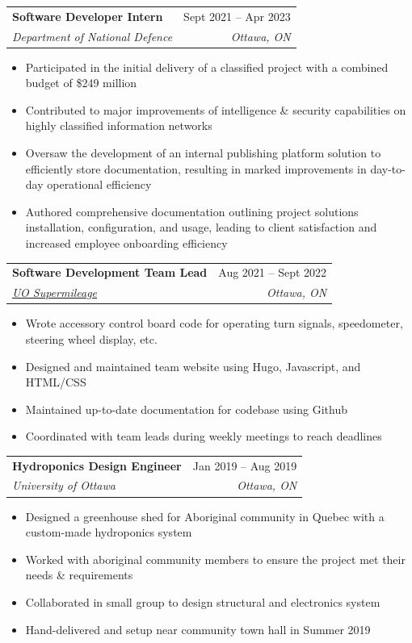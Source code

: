 \documentclass[letterpaper,11pt]{article}
\makeatletter
\newcommand{\resumeItem}[1]{
  \item\small{
    {#1 \vspace{-2pt}}
  }
}
\newcommand{\resumeSubheading}[4]{
  \vspace{-2pt}\item
    \begin{tabular*}{0.97\textwidth}[t]{l@{\extracolsep{\fill}}r}
      \textbf{#1} & #2 \\
      \textit{\small#3} & \textit{\small #4} \\
    \end{tabular*}\vspace{-7pt}
}
\newcommand{\resumeItemListStart}{\begin{itemize}}
\newcommand{\resumeItemListEnd}{\end{itemize}\vspace{-5pt}}
\makeatother
\begin{document}
\resumeSubheading
{Software Developer Intern}{Sept 2021 -- Apr 2023}
{Department of National Defence}{Ottawa, ON}
\resumeItemListStart
\resumeItem {Participated in the initial delivery of a classified project with a combined budget of \$249 million}
\resumeItem {Contributed to major improvements of intelligence \& security capabilities on highly classified information networks}
\resumeItem {Oversaw the development of an internal publishing platform solution to efficiently store documentation, resulting in marked improvements in day-to-day operational efficiency}
\resumeItem {Authored comprehensive documentation outlining project solutions installation, configuration, and usage, leading to client satisfaction and increased employee onboarding efficiency}
\resumeItemListEnd

\resumeSubheading
{Software Development Team Lead}{Aug 2021 -- Sept 2022}
{\href{https://uosupermileage.ca}{UO Supermileage}}{Ottawa, ON}
\resumeItemListStart
\resumeItem {Wrote accessory control board code for operating turn signals, speedometer, steering wheel display, etc.}
\resumeItem {Designed and maintained team website using Hugo, Javascript, and HTML/CSS}
\resumeItem {Maintained up-to-date documentation for codebase using Github}
\resumeItem {Coordinated with team leads during weekly meetings to reach deadlines}
\resumeItemListEnd

\resumeSubheading
{Hydroponics Design Engineer}{Jan 2019 -- Aug 2019}
{University of Ottawa}{Ottawa, ON}
\resumeItemListStart
\resumeItem {Designed a greenhouse shed for Aboriginal community in Quebec with a custom-made hydroponics system}
\resumeItem {Worked with aboriginal community members to ensure the project met their needs \& requirements}
\resumeItem {Collaborated in small group to design structural and electronics system}
\resumeItem {Hand-delivered and setup near community town hall in Summer 2019}
\resumeItemListEnd


\end{document}
